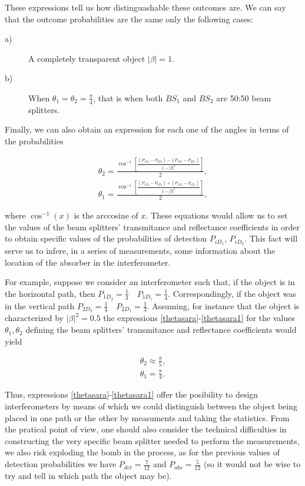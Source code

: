 \documentclass[12pt]{book}
\begin{document}
These expressions tell us how distinguashable these outcomes are.  We can say that the outcome probabilities are the same only the following cases:

\begin{description}

\item[a)] A completely transparent object $|\beta|=1$.

\item[b)] When $\theta_{1}=\theta_{2}=\frac{\pi}{4}$, that is when both $BS_{1}$ and $BS_{2}$ are 50:50 beam splitters.
\end{description}

Finally, we can also obtain an expression for each one of the angles in terms of the probabilities


\begin{align}
\theta_{2}=\displaystyle \frac{\cos^{-1}\left[\frac{(P_{1D_{2}}-P_{2D_{2}})-(P_{1D_{1}}-P_{2D_{1}})}{1-|\beta|^2}\right]}{2},\label{thetasara}\\
\theta_{1}=\displaystyle \frac{\cos^{-1}\left[\frac{(P_{1D_{2}}-P_{2D_{2}})+(P_{1D_{1}}-P_{1D_{1}})}{1-|\beta|^2}\right]}{2}\label{thetasara1},
\end{align}


where $\cos^{-1}(x)$ is the arccosine of $x$. These equations would allow us  to set the values of the beam splitters' transmitance and reflectance coefficients in order to obtain specific values of the probabilities of detection $P_{iD_{1}}$, $P_{iD_{2}}$. This fact will serve us to infere, in a series of measurements, some information about the location of the absorber in the interferometer.  

For example, suppose we consider an interferometer such that, if the object is in the horizontal path, then $P_{1D_{2}}=\frac{1}{3} \quad P_{1D_{1}}=\frac{1}{4}$. Correspondingly,  if the object was in the vertical path $P_{2D_{2}}=\frac{1}{4} \quad P_{2D_{1}}=\frac{1}{3}$. Assuming, for instance that the object is characterized by $|\beta|^{2}=0.5$ the expressions \ref{thetasara}-\ref{thetasara1} for the values $\theta_{1},\theta_{2}$ defining the beam splitters' transmitance and reflectance coefficients would yield

\begin{align*}
\theta_{2} \approx \frac{\pi}{5},\\
\theta_{1} = \frac{\pi}{4}.
\end{align*}

Thus, expressions \ref{thetasara}-\ref{thetasara1} offer the posibility to design interferometers by means of which we could distinguish between the object being placed in one path or the other by measuments and taking the statistics. From the pratical point of view, one should also consider the technical difficulties in constructing the very specific beam splitter needed to perform the measurements, we also risk exploding the bomb in the process, as for the previous values of detection probabilities we have $P_{det}=\frac{7}{12}$ and $P_{abs}=\frac{5}{12}$ (so it would not be wise to try and tell in which path the object may be).
 
\end{document}
